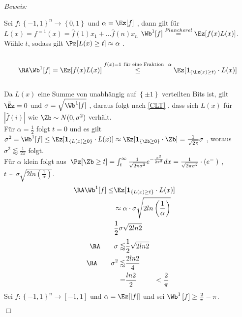 \documentclass{article}
\renewcommand{\ez}{\mathbf{1}}
\newenvironment{proof}{
	\textit{Beweis: \\}
}{
	\begin{flushright}
		$\Box$ 
	\end{flushright}
}
\begin{document}
\begin{satz}
\begin{proof}
		 Sei $f:\left\lbrace -1 ,1 \right\rbrace^n \to \left\lbrace 0,1 \right\rbrace $ und $ \alpha = \Ez [f] $ , dann gilt f\"ur $L(x)=f^{=1}(x)=\hat{f}(1)x_1+ \dots \hat{f}(n)x_n$ $ \Wb^1 [f] \overset{Plancherel}{=} \Ez [f(x)L(x)] $. \\
		 W{\"a}hle $t$, sodass gilt $ \Pz[L(x)\geq t] \approx \alpha $ .\\
		 \\
		 \[\RA    \Wb^1[f] = \Ez[f(x)L(x)] \overset{f(x)=1 \ \text{f\"ur eine Fraktion } \ \alpha}{\leq} \Ez[\ez_{(\Lz(x)\geq t)}  \cdot L(x) ]  \] \\
		 Da $L(x)$ eine Summe von unabh\"angig auf $ \left\lbrace \pm 1 \right\rbrace $ verteilten Bits ist, gilt $\bar {\Ez } =0$ und $ \sigma = \sqrt{\Wb^1[f]}$ , daraus folgt nach \ref{CLT} , dass sich $L(x)$ f\"ur $ \left| \widehat{f}(i) \right| $ wie  $\Zb \sim N (0, \sigma^2) $ verh\"alt.\\
		 F\"ur $\alpha = \frac{1}{2} $ folgt  $t=0$ und es gilt $ \sigma^2 = \Wb^1[f] \leq \Ez [\ez_{ \left\lbrace L(x) \geq 0 \right\rbrace } \cdot L(x) ] \approx \Ez[\ez_{\left\lbrace \Zb \geq 0 \right\rbrace } \cdot \Zb ]= \frac{1}{\sqrt{2 \pi }}\sigma$ , woraus $\sigma^2  \lessapprox \frac{1}{2 \pi} $ folgt.\\
		 F\"ur $\alpha $ klein folgt aus\ 
		 $
		  \Pz [\Zb \geq t]=\int_{t}^{\infty} \frac{1}{\sqrt{2 \pi \sigma^2}} e^{-\frac{x^2}{2 \pi^2} } dx  =  \frac{1}{\sqrt{2 \pi \sigma^2}} \cdot \left( e^{-\frac{}{}} \right) 
		 $ , \text{dass gilt } $  t \sim \sigma \sqrt{2 ln  \left( \frac{1}{\alpha} \right) }$.
		\begin{eqnarray*}
			\RA  \Wb^1[f] \leq & \Ez [\ez_{ \left\lbrace L(x) \geq t \right\rbrace } \cdot L(x) ] & \\
			&\approx \alpha \cdot \sigma \sqrt{2 ln\left( \frac{1}{\alpha}\right)}& \\
			& \frac{1}{2} \sigma  \sqrt{2 ln 2}& \\
		\end{eqnarray*}
		\begin{eqnarray*}
		\RA \qquad \sigma \lessapprox &\frac{1}{2} \sqrt{2 ln 2}& \\
		\RA \qquad \sigma^2 \lessapprox & \frac{2 ln 2}{4} & \\
		=& \frac{ln 2}{2} &< \frac{2}{\pi}
		\end{eqnarray*}
		Sei $ f:\left\lbrace -1,1 \right\rbrace^n \to \left[ -1,1 \right]$ und  $\alpha=\Ez[\left| f\right|] $ und sei $\Wb^1\left[f\right]\ge \frac{2}{\pi}-\pi$.\\

\end{proof}
\end{satz}
\end{document}
